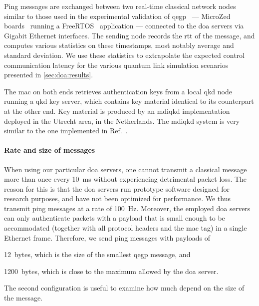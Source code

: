 Ping messages are exchanged between two real-time classical network nodes similar to those used in
the experimental validation of \acrshort{qegp}~\cite{pompili_2022_experimental} --- MicroZed
boards~\cite{microzed} running a FreeRTOS~\cite{freertos} application --- connected to the
\acrshort{doa} servers via Gigabit Ethernet interfaces. The sending node records the \acrshort{rtt}
of the message, and computes various statistics on these timestamps, most notably average and
standard deviation. We use these statistics to extrapolate the expected control communication
latency for the various quantum link simulation scenarios presented in \cref{sec:doa:results}.

The \acrfull{mac} on both ends retrieves authentication keys from a local \acrshort{qkd} node
running a \acrshort{qkd} key server, which contains key material identical to its counterpart at the
other end. Key material is produced by an \acrshort{mdiqkd} implementation deployed in the Utrecht
area, in the Netherlands. The \acrshort{mdiqkd} system is very similar to the one implemented in
Ref.~\cite{berrevoets_2022_deployed}.

\paragraph{Rate and size of messages}

When using our particular \acrshort{doa} servers, one cannot transmit a classical message more than
once every \qty{10}{\ms} without experiencing detrimental packet loss. The reason for this is that
the \acrshort{doa} servers run prototype software designed for research purposes, and have not been
optimized for performance. We thus transmit ping messages at a rate of \qty{100}{\Hz}. Moreover, the
employed \acrshort{doa} servers can only authenticate packets with a payload that is small enough to
be accommodated (together with all protocol headers and the \acrshort{mac} tag) in a single Ethernet
frame. Therefore, we send ping messages with payloads of
%
\begin{inlinelist}
    \item \num{12}~bytes, which is the size of the smallest \acrshort{qegp} message, and
    \item \num{1200}~bytes, which is close to the maximum allowed by the \acrshort{doa} server.
\end{inlinelist}
The second configuration is useful to examine how much  depend on the size of the
message.

